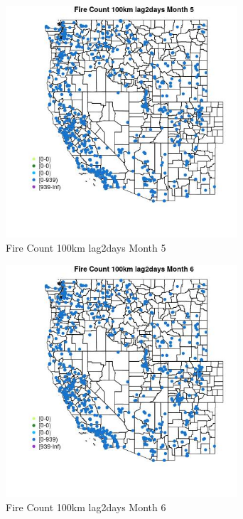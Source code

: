 \begin{figure} 
\centering  
\includegraphics[width=0.77\textwidth]{Code_Outputs/Report_ML_input_PM25_Step4_part_e_de_duplicated_aves_compiled_2019-05-21wNAs_MapObsMo5Fire_Count_100km_lag2days.jpg} 
\caption{\label{fig:Report_ML_input_PM25_Step4_part_e_de_duplicated_aves_compiled_2019-05-21wNAsMapObsMo5Fire_Count_100km_lag2days}Fire Count 100km lag2days Month 5} 
\end{figure} 
 

\begin{figure} 
\centering  
\includegraphics[width=0.77\textwidth]{Code_Outputs/Report_ML_input_PM25_Step4_part_e_de_duplicated_aves_compiled_2019-05-21wNAs_MapObsMo6Fire_Count_100km_lag2days.jpg} 
\caption{\label{fig:Report_ML_input_PM25_Step4_part_e_de_duplicated_aves_compiled_2019-05-21wNAsMapObsMo6Fire_Count_100km_lag2days}Fire Count 100km lag2days Month 6} 
\end{figure} 
 

